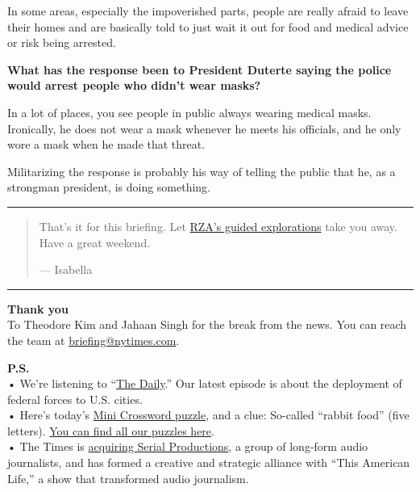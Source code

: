 In some areas, especially the impoverished parts, people are really
afraid to leave their homes and are basically told to just wait it out
for food and medical advice or risk being arrested.

\textbf{What has the response been to President Duterte saying the
police would arrest people who didn't wear masks?}

In a lot of places, you see people in public always wearing medical
masks. Ironically, he does not wear a mask whenever he meets his
officials, and he only wore a mask when he made that threat.

Militarizing the response is probably his way of telling the public that
he, as a strongman president, is doing something.

\begin{center}\rule{0.5\linewidth}{\linethickness}\end{center}

\begin{quote}
That's it for this briefing. Let
\href{https://open.spotify.com/playlist/4j69qjJM2f288elsB28FQG}{RZA's
guided explorations} take you away. Have a great weekend.

--- Isabella
\end{quote}

\begin{center}\rule{0.5\linewidth}{\linethickness}\end{center}

\textbf{Thank you}\\
To Theodore Kim and Jahaan Singh for the break from the news. You can
reach the team at
\href{mailto:briefing+midnight@nytimes.com?subject=Briefing\%20Feedback}{briefing@nytimes.com}.

\textbf{P.S.}\\
• We're listening to ``\href{https://www.nytimes.com/thedaily}{The
Daily}.'' Our latest episode is about the deployment of federal forces
to U.S. cities.\\
• Here's today's
\href{https://www.nytimes.com/crosswords/game/mini}{Mini Crossword
puzzle}, and a clue: So-called ``rabbit food'' (five letters).
\href{https://www.nytimes.com/crosswords}{You can find all our puzzles
here}.\\
• The Times is \href{https://t.co/IjClG0T68u}{acquiring Serial
Productions}, a group of long-form audio journalists, and has formed a
creative and strategic alliance with ``This American Life,'' a show that
transformed audio journalism.

